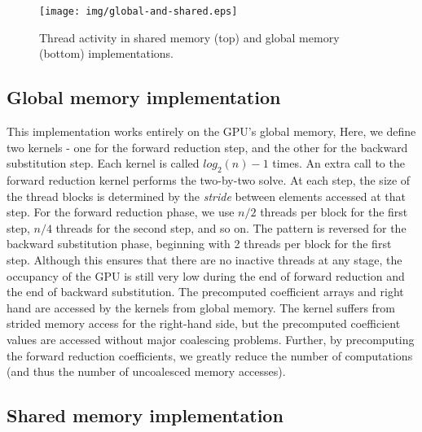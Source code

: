 \begin{figure}
\begin{center}
\texttt{[image: img/global-and-shared.eps]}
\end{center}
\caption{Thread activity in shared memory (top) and global memory (bottom) implementations.}
\label{fig:global-and-shared}
\end{figure}

\subsection{Global memory implementation}

This implementation works entirely on the GPU's global memory,
Here, we define two kernels - one for the forward reduction step,
and the other for the backward substitution step.
Each kernel is called $log_2(n)-1$ times.
An extra call to the
forward reduction kernel performs
the two-by-two solve.
At each step,
the size of the thread blocks is determined by the \emph{stride}
between elements accessed at that step.
For the forward reduction phase,
we use $n/2$ threads per block for the first step,
$n/4$ threads for the second step, and so on.
The pattern is reversed for the backward substitution phase,
beginning with 2 threads per block for the first step.
Although this ensures that there are no inactive threads
at any stage,
the occupancy of the GPU is still very low
during the end of forward reduction and the end of backward substitution.
The precomputed coefficient arrays and right hand
are accessed by the kernels from global memory.
The kernel suffers from
strided memory access for the right-hand side,
but the precomputed coefficient values are accessed
without major coalescing problems.
Further, by precomputing the forward reduction coefficients,
we greatly reduce the number of computations
(and thus the number of uncoalesced memory accesses).

\subsection{Shared memory implementation}

